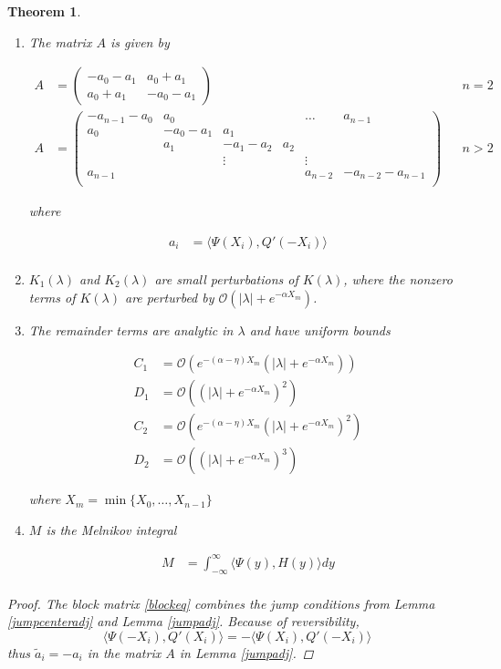 \documentclass[12pt]{article}
\newtheorem{theorem}{Theorem}
\begin{document}
\begin{theorem}
\begin{enumerate}
\item The matrix $A$ is given by

\begin{align*}
A &= \begin{pmatrix}
-a_0 -a_1 & a_0 + a_1 \\
a_0 + a_1 & -a_0 - a_1
\end{pmatrix} && n = 2 \\
A &= \begin{pmatrix}
-a_{n-1} - a_0 & a_0 & & & \dots & a_{n-1}\\
a_0 & -a_0 - a_1 &  a_1 \\
& a_1 & -a_1 - a_2 &  a_2 \\
& & \vdots & & \vdots \\
a_{n-1} & & & & a_{n-2} & -a_{n-2} - a_{n-1} \\
\end{pmatrix} && n > 2
\end{align*}

where

\begin{align*}
a_i &= \langle \Psi(X_i), Q'(-X_i) \rangle \\
\end{align*}

\item $K_1(\lambda)$ and $K_2(\lambda)$ are small perturbations of $K(\lambda)$, where the nonzero terms of $K(\lambda)$ are perturbed by $\mathcal{O}(|\lambda| + e^{-\alpha X_m})$.

\item The remainder terms are analytic in $\lambda$ and have uniform bounds

\begin{align*}
C_1 &= \mathcal{O}\left(e^{-(\alpha - \eta) X_m}(|\lambda| + e^{-\alpha X_m}) \right) \\
D_1 &= \mathcal{O}\left((|\lambda| + e^{-\alpha X_m})^2 \right) \\
C_2 &= \mathcal{O}\left(e^{-(\alpha - \eta) X_m}(|\lambda| + e^{-\alpha X_m})^2 \right) \\
D_2 &= \mathcal{O}\left((|\lambda| + e^{-\alpha X_m})^3 \right)
\end{align*}

where $X_m = \min \{X_0, \dots, X_{n-1}\}$

\item $M$ is the Melnikov integral

\begin{align*}
M &= \int_{-\infty}^\infty \langle \Psi(y), H(y) \rangle dy \\
\end{align*}

\end{enumerate}

\begin{proof}
The block matrix \eqref{blockeq} combines the jump conditions from Lemma \ref{jumpcenteradj} and Lemma \ref{jumpadj}. Because of reversibility, 
\[
\langle \Psi(-X_i), Q'(X_i) \rangle = -\langle \Psi(X_i), Q'(-X_i) \rangle
\]
thus $\tilde{a}_i = -a_i$ in the matrix $A$ in Lemma \ref{jumpadj}.
\end{proof}
\end{theorem}
\end{document}
